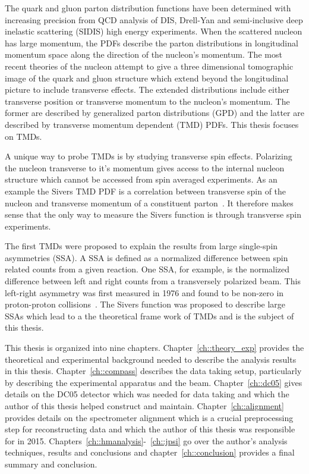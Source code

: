The quark and gluon parton distribution functions have been determined with
increasing precision from QCD analysis of DIS, Drell-Yan and semi-inclusive deep
inelastic scattering (SIDIS) high energy experiments.  When the scattered
nucleon has large momentum, the PDFs describe the parton distributions
in longitudinal momentum space along the direction of the nucleon's momentum.
The most recent theories of the nucleon attempt to give a three dimensional
tomographic image of the quark and gluon structure which extend beyond the
longitudinal picture to include transverse effects.  The extended distributions
include either transverse position or transverse momentum to the nucleon's
momentum.  The former are described by generalized parton distributions (GPD)
and the latter are described by transverse momentum dependent (TMD) PDFs.  This
thesis focuses on TMDs.

A unique way to probe TMDs is by studying transverse spin effects.  Polarizing
the nucleon transverse to it's momentum gives access to the internal nucleon
structure which cannot be accessed from spin averaged experiments.  As an
example the Sivers TMD PDF is a correlation between transverse spin of the
nucleon and transverse momentum of a constituent parton~\cite{Sivers}.  It
therefore makes sense that the only way to measure the Sivers function is
through transverse spin experiments.

The first TMDs were proposed to explain the results from large single-spin
asymmetries (SSA).  A SSA is defined as a normalized difference between spin
related counts from a given reaction.  One SSA, for example, is the normalized
difference between left and right counts from a transversely polarized beam.
This left-right asymmetry was first measured in 1976 and found to be non-zero in
proton-proton collisions~\cite{PhysRevLett.36.929}.  The Sivers function was
proposed to describe large SSAs which lead to a the theoretical frame work of
TMDs and is the subject of this thesis.

This thesis is organized into nine chapters.  Chapter~\ref{ch::theory_exp}
provides the theoretical and experimental background needed to describe the
analysis results in this thesis.  Chapter~\ref{ch::compass} describes the data
taking setup, particularly by describing the experimental apparatus and the
beam.  Chapter~\ref{ch::dc05} gives details on the DC05 detector which was
needed for data taking and which the author of this thesis helped construct and
maintain.  Chapter~\ref{ch::alignment} provides details on the spectrometer
alignment which is a crucial preprocessing step for reconstructing data and
which the author of this thesis was responsible for in 2015.
Chapters~\ref{ch::hmanalysis}-~\ref{ch::jpsi} go over the author's analysis
techniques, results and conclusions and chapter~\ref{ch::conclusion} provides
a final summary and conclusion.
